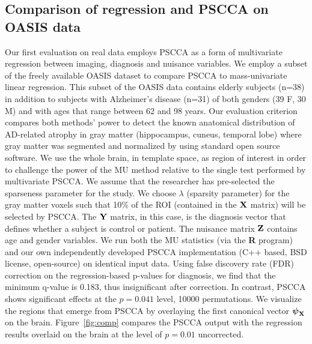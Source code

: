 \documentclass{llncs}
\newcommand{\X}{{\bf X}}
\newcommand{\Y}{{\bf Y}}
\newcommand{\Z}{{\bf Z}}
\newcommand{\bs}{\boldsymbol}
\begin{document}
\subsection{Comparison of regression and PSCCA on OASIS data}
Our first evaluation on real data employs PSCCA as a form of
multivariate regression between imaging, diagnosis and nuisance variables.  
We employ a subset of the freely available OASIS dataset to compare
PSCCA to mass-univariate linear regression.  This subset of the OASIS
data contains elderly subjects (n=38) in addition to subjects with
Alzheimer's disease (n=31) of both genders (39 F, 30 M) and with ages
that range between 62 and 98 years.  Our evaluation criterion compares
both methods' power to detect the known anatomical distribution of
AD-related atrophy in gray matter (hippocampus, cuneus, temporal lobe)
\cite{Avants2010b} where gray matter was segmented and normalized by using standard
open source software.  We use the whole brain, in template space, as region of interest in order to
challenge the power of the MU method relative to the
single test performed by multivariate PSCCA.  We assume that the
researcher has pre-selected the sparseness parameter for the study.
We choose $\lambda$ (sparsity parameter) for the gray matter voxels such that 10\% of the
ROI (contained in the $\X$ matrix) will be selected by PSCCA.  The
$\Y$ matrix, in this case, is the diagnosis vector that defines
whether a subject is control or patient.  The nuisance matrix $\Z$
contains age and gender variables.  We run both the MU
statistics (via the {\bf R} program) and our own independently
developed PSCCA implementation (C++ based, BSD license, open-source)
on identical input data.  Using false discovery rate (FDR) correction
on the regression-based p-values for diagnosis, we find that the
minimum q-value is 0.183, thus insignificant after correction.  In
contrast, PSCCA shows significant effects at the $p=0.041$ level,
10000 permutations.  We visualize the regions that emerge from PSCCA
by overlaying the first canonical vector $\bs \psi_{\X}$ on the brain.
Figure~\ref{fig:comp} compares the PSCCA output with the regression
results overlaid on the brain at the level of $p=0.01$ uncorrected.
\vspace{-0.1in}
\end{document}
